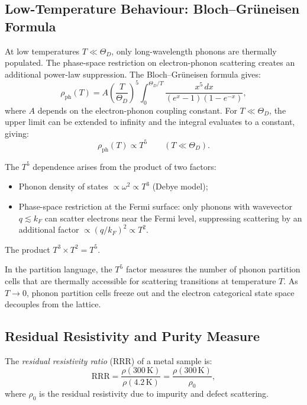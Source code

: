\subsection{Low-Temperature Behaviour: Bloch--Gr\"{u}neisen Formula}

At low temperatures $T \ll \Theta_D$, only long-wavelength phonons are
thermally populated.  The phase-space restriction on electron-phonon
scattering creates an additional power-law suppression.  The
Bloch--Gr\"{u}neisen formula gives:
\begin{equation}
  \rho_{\mathrm{ph}}(T) = A \left(\frac{T}{\Theta_D}\right)^5
    \int_0^{\Theta_D/T}
    \frac{x^5\,dx}{(e^x - 1)(1 - e^{-x})},
  \label{eq:ch18-blochgruneisen}
\end{equation}
where $A$ depends on the electron-phonon coupling constant.  For
$T \ll \Theta_D$, the upper limit can be extended to infinity and the
integral evaluates to a constant, giving:
\begin{equation}
  \rho_{\mathrm{ph}}(T) \propto T^5 \qquad (T \ll \Theta_D).
  \label{eq:ch18-t5}
\end{equation}

\begin{lemma}
\label{lem:ch18-t5}
The $T^5$ dependence arises from the product of two factors:
\begin{itemize}
  \item Phonon density of states $\propto \omega^2 \propto T^3$ (Debye
    model);
  \item Phase-space restriction at the Fermi surface: only phonons with
    wavevector $q \lesssim k_F$ can scatter electrons near the Fermi
    level, suppressing scattering by an additional factor $\propto
    (q/k_F)^2 \propto T^2$.
\end{itemize}
The product $T^3 \times T^2 = T^5$.
\end{lemma}

In the partition language, the $T^5$ factor measures the number of phonon
partition cells that are thermally accessible for scattering transitions
at temperature $T$.  As $T \to 0$, phonon partition cells freeze out and
the electron categorical state space decouples from the lattice.

\subsection{Residual Resistivity and Purity Measure}

\begin{definition}
\label{def:ch18-rrr}
The \emph{residual resistivity ratio} (RRR) of a metal sample is:
\begin{equation}
  \mathrm{RRR} = \frac{\rho(300\,\mathrm{K})}{\rho(4.2\,\mathrm{K})}
    = \frac{\rho(300\,\mathrm{K})}{\rho_0},
  \label{eq:ch18-rrr}
\end{equation}
where $\rho_0$ is the residual resistivity due to impurity and defect
scattering.
\end{definition}

